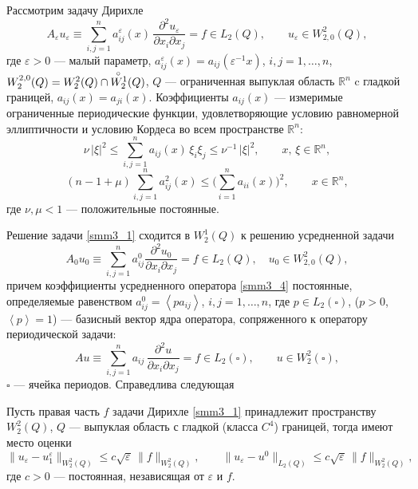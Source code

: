 Рассмотрим задачу Дирихле
\begin{equation}\label{smm3_1}
  A_\varepsilon u_\varepsilon\equiv\sum\limits_{i,j=1}^na_{ij}^\varepsilon(x)\,
\frac{\partial^2u_\varepsilon}{\partial x_i\partial x_j}=f\in
L_2(Q), \qquad
   u_\varepsilon\in W_{2,0}^2(Q),
\end{equation}
где $\varepsilon>0$ --- малый параметр,  $a_{ij}^\varepsilon(x)=a_{ij}
(\varepsilon^{-1}x)$,
$i,j=1,\dots,n$, $W_2^{2,0}(Q)=W_2^2(Q)\cap \overset{\!\circ}{W_2^{\smash[t]1}}(Q)$,
$Q$ --- ограниченная выпуклая область
$\mathbb{R}^n$ c гладкой границей, $a_{ij}(x)=a_{ji}(x)$. Коэффициенты
 $a_{ij}(x)$  --- измеримые ограниченные
периодические
функции, удовлетворяющие условию равномерной эллиптичности
 и условию Кордеса во всем пространстве $\mathbb{R}^n$:
 \begin{equation}\label{smm3_2}
\nu\,|\xi|^2\leq\sum_{i,j=1}^na_{ij}(x)\,\xi_i\xi_j\leq\nu^{-1}\,|\xi|^2,
\qquad x,\,\xi\in\mathbb{R}^n,
\end{equation}
\vspace{-3mm}
\begin{equation}\label{smm3_3}
(n-1+\mu)\sum_{i,j=1}^na_{ij}^2(x)\leq\Big(\sum_{i=1}^na_{ii}(x)\Big)^2,
\qquad x\in \mathbb{R}^n,
\end{equation}
где $\nu, \mu<1$ --- положительные постоянные.

Решение задачи \eqref{smm3_1} сходится в $W_2^1(Q)$ к решению усредненной задачи
\begin{equation}\label{smm3_4}
A_0u_0\equiv \sum_{i,j=1}^na_{ij}^0\frac{\partial^2u_0}{\partial x_i
\partial x_j}=f\in L_2(Q),\quad u_0\in W_{2,0}^2(Q),
\end{equation}
 причем коэффициенты усредненного оператора \eqref{smm3_4} постоянные, определяемые  равенством $a_{ij}^0=\left<pa_{ij}\right>$,
$i,j=1,\dots,n$, где $p\in L_2(\square)$, ($p>0$, $\left\langle p\right\rangle=1$) --- базисный вектор ядра оператора, сопряженного к оператору периодической задачи:
$$
A u\equiv\sum\limits_{i,j=1}^na_{ij}\,
\frac{\partial^2u}{\partial x_i\partial x_j}=f\in
L_2(\square), \qquad
   u\in W_{2}^2(\square),
$$
$\square$ --- ячейка периодов.
Справедлива следующая

\begin{theorem}
Пусть правая часть $f$ задачи Дирихле \eqref{smm3_1} принадлежит пространству \linebreak $W^2_2(Q)$,  $Q$ --- выпуклая область с гладкой \textrm{(}класса $C^4$\textrm{)} границей, тогда имеют место оценки
\begin{equation}\label{smm3_5}
\|u_\varepsilon-u_1^\varepsilon\|_{W^2_2(Q)}\leqslant c\sqrt{\varepsilon}\,\|f\|_{W^2_2(Q)},\qquad
\|u_\varepsilon-u^0\|_{L_2(Q)}\leqslant c\sqrt{\varepsilon}\,\|f\|_{W^2_2(Q)},
\end{equation}
где $c>0$ --- постоянная, независящая от $\varepsilon$ и $f$.
\end{theorem}

